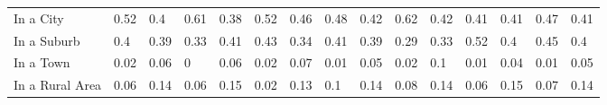 \begin{longtabu}{X[4,l] X[0.5,c] X[1,c] X[0.5,c] X[1,c] X[0.5,c] X[1,c] X[0.5,c] X[1,c] X[0.5,c] X[1,c] X[0.5,c] X[1,c] X[0.5,c] X[1,c]}
\hspace{0.2cm}In a City&0.52&0.4&0.61&0.38&0.52&0.46&0.48&0.42&0.62&0.42&0.41&0.41&0.47&0.41\\%
\hspace{0.2cm}In a Suburb&0.4&0.39&0.33&0.41&0.43&0.34&0.41&0.39&0.29&0.33&0.52&0.4&0.45&0.4\\%
\hspace{0.2cm}In a Town&0.02&0.06&0&0.06&0.02&0.07&0.01&0.05&0.02&0.1&0.01&0.04&0.01&0.05\\%
\hspace{0.2cm}In a Rural Area&0.06&0.14&0.06&0.15&0.02&0.13&0.1&0.14&0.08&0.14&0.06&0.15&0.07&0.14\\%
\end{longtabu}
\newpage
